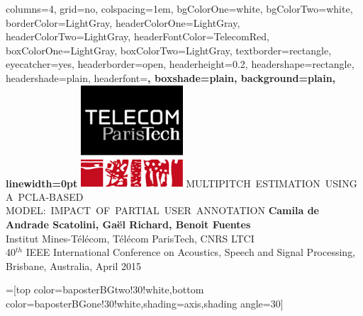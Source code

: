 \documentclass[landscape,final]{baposter}
\theoremstyle{definition}
\begin{document}
\begin{poster}
{
  columns=4,
  grid=no,
  colspacing=1em,
  bgColorOne=white, %
  bgColorTwo=white, %
  borderColor=LightGray,
  headerColorOne=LightGray,
  headerColorTwo=LightGray,
  headerFontColor=TelecomRed,
  boxColorOne=LightGray,
  boxColorTwo=LightGray,
  textborder=rectangle,
  eyecatcher=yes,
  headerborder=open,
  headerheight=0.2\textheight,
  headershape=rectangle,
  headershade=plain,
  headerfont=\bf\Large\textsf, %
  boxshade=plain,
  background=plain,
  linewidth=0pt
  }
  {
  	\includegraphics[height=3.8cm]{logoTPT}
  }
  {\sf %
  \huge
MULTIPITCH\, ESTIMATION\, USING\, A\, PCLA-BASED\\ \vspace{3mm}
MODEL:\, IMPACT\, OF\, PARTIAL\, USER\, ANNOTATION}
  {\sf %
  \vspace{2mm}
\textbf{Camila de Andrade Scatolini, Ga\"el Richard, Benoit Fuentes} \\
Institut Mines-T\'el\'ecom, T\'el\'ecom ParisTech, CNRS LTCI \\\vspace{1mm}
\textcolor{DarkerGray}{40$^{th}$ IEEE International Conference on Acoustics, Speech and Signal Processing, Brisbane, Australia, April 2015}
  }
  {
  }

  =[top color=baposterBGtwo!30!white,bottom color=baposterBGone!30!white,shading=axis,shading angle=30]

     \newlength{\leftimgwidth}
     \setlength{\leftimgwidth}{0.78em+18.0em}


\end{poster}
\end{document}
